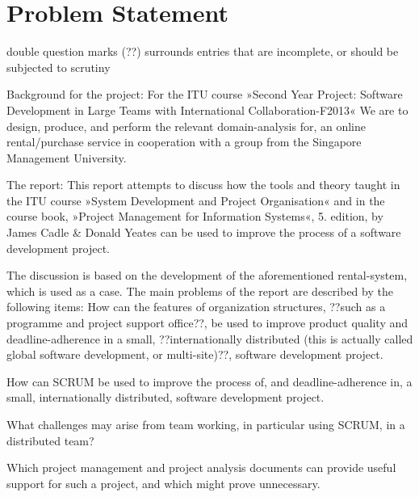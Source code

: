 \section{Problem Statement}
\label{sec:problemstatement}
double question marks (??) surrounds entries that are incomplete, or should be
subjected to scrutiny

Background for the project:
For the ITU course »Second Year Project: Software Development in Large Teams with
International Collaboration-F2013«
We are to design, produce, and perform the relevant domain-analysis for,
an online rental/purchase service in cooperation with a group from the Singapore
Management University.

The report:
This report attempts to discuss how the tools and theory taught in the
ITU course »System Development and Project Organisation« and in the
course book, »Project Management for Information Systems«, 5. edition, by 
James Cadle \& Donald Yeates can be used to improve the process of a software development project.

The discussion is based on the development of the aforementioned
rental-system, which is used as a case.
The main problems of the report are described by the following items:
How can the features of organization structures, ??such as a
programme and project support office??, be used to improve
product quality and deadline-adherence in a small,
??internationally distributed (this is actually called global
software development, or multi-site)??,  software development project.

How can SCRUM be used to improve the process of, and 
deadline-adherence in, a small, internationally distributed,
software development project.

What challenges may arise from team working, in particular
using SCRUM, in a distributed team?

Which project management and project analysis documents can
provide useful support for such a project, and which might
prove unnecessary.
